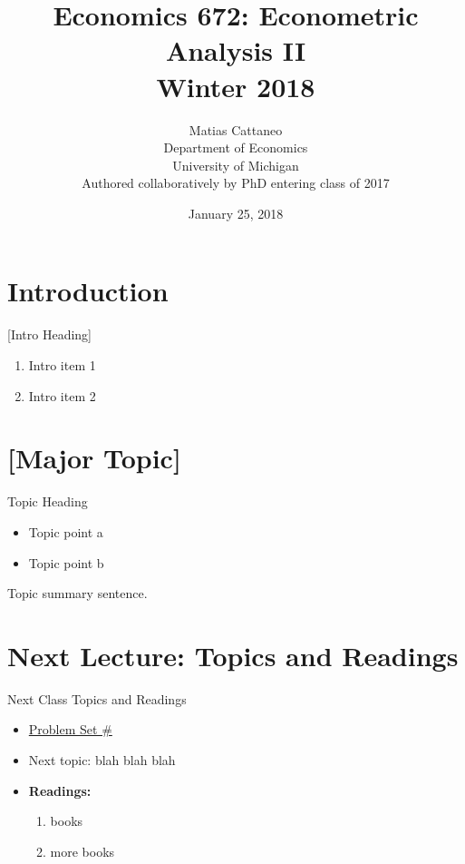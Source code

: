 \documentclass[fleqn, 10pt]{beamer}
\title[Econ-672]{Economics 672: Econometric Analysis II \\ Winter 2018}
\author[M. Cattaneo]{Matias Cattaneo \\
        Department of Economics \\
        University of Michigan \\
        Authored collaboratively by PhD entering class of 2017
        }
\date{January 25, 2018}
\begin{document}


\begin{frame}[plain]
    \titlepage
\end{frame}


\section{Introduction}

\begin{frame}{[Intro Heading]}
    \begin{enumerate}
		\item Intro item 1
		\item Intro item 2
	\end{enumerate}
\end{frame}


\section{[Major Topic]}

\begin{frame}{Topic Heading}

    \begin{itemize}
		\item Topic point a
		\item Topic point b
	\end{itemize}
	Topic summary sentence.
	
\end{frame}


\section{Next Lecture: Topics and Readings}

\begin{frame}{Next Class Topics and Readings}
	
	\begin{itemize}
		\item \underline{Problem Set \#}
		\item Next topic: blah blah blah
		\item \textbf{Readings:}
		\begin{enumerate}
			\item books
			\item more books
		\end{enumerate}
	\end{itemize}
	
\end{frame}
\end{document}

